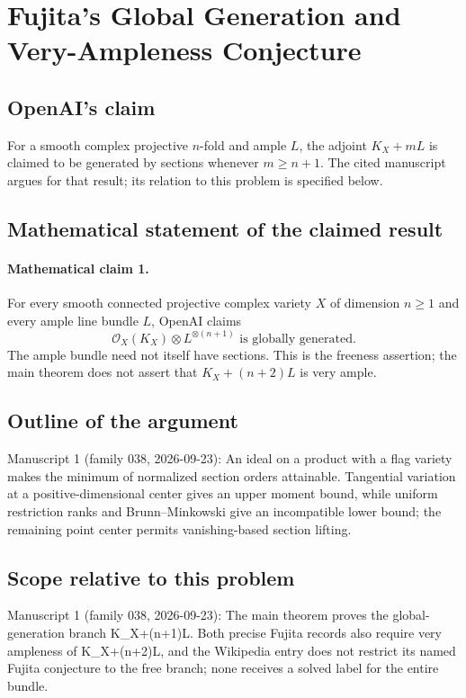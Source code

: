 \documentclass[11pt]{article}
\begin{document}
\section*{Fujita's Global Generation and Very-Ampleness Conjecture}

\subsection{OpenAI's claim}
For a smooth complex projective $n$-fold and ample $L$, the adjoint $K_X+mL$ is claimed to be generated by sections whenever $m\ge n+1$. The cited manuscript argues for that result; its relation to this problem is specified below.

\subsection{Mathematical statement of the claimed result}
\paragraph{Mathematical claim 1.} For every smooth connected projective complex variety $X$ of dimension $n\ge1$ and every ample line bundle $L$, OpenAI claims
\[
\mathcal O_X(K_X)\otimes L^{\otimes(n+1)}\text{ is globally generated}.
\]
The ample bundle need not itself have sections. This is the freeness assertion; the main theorem does not assert that $K_X+(n+2)L$ is very ample.

\subsection{Outline of the argument}
Manuscript 1 (family 038, 2026-09-23): An ideal on a product with a flag variety makes the minimum of normalized section orders attainable. Tangential variation at a positive-dimensional center gives an upper moment bound, while uniform restriction ranks and Brunn--Minkowski give an incompatible lower bound; the remaining point center permits vanishing-based section lifting.

\subsection{Scope relative to this problem}
Manuscript 1 (family 038, 2026-09-23): The main theorem proves the global-generation branch K\_X+(n+1)L. Both precise Fujita records also require very ampleness of K\_X+(n+2)L, and the Wikipedia entry does not restrict its named Fujita conjecture to the free branch; none receives a solved label for the entire bundle.
\end{document}
